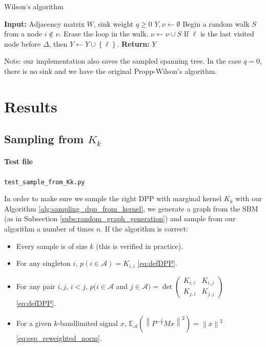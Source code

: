\documentclass{article}
\newcommand{\norm}[1]{\left\|#1\right\|}
\begin{document}
\begin{algorithm}[ht]
\caption{Wilson's algorithm}
\label{alg:wilson_algorithm}
\begin{algorithmic} %
    \STATE \textbf{Input:} Adjacency matrix $W$, sink weight $q \geq 0$
    \STATE $Y, \nu \leftarrow \emptyset$
			\STATE Begin a random walk $S$ from a node $i \notin \nu$.
				\STATE Erase the loop in the walk.
				\STATE $\nu \leftarrow \nu \cup S$
					\STATE If $\ell$ is the last visited node before $\Delta$, then $Y \leftarrow Y \cup \left\{\ell\right\}$.
				\ENDIF
			\ENDIF
		\ENDWHILE
		\STATE \textbf{Return:} $Y$
\end{algorithmic}
Note: our implementation also saves the sampled spanning tree. In the case $q = 0$, there is no sink and we have the original Propp-Wilson's algorithm.
\end{algorithm}


\section{Results}


\subsection[Sampling from Kk]{Sampling from $K_k$}


\paragraph{Test file} \verb#test_sample_from_Kk.py#


In order to make sure we sample the right DPP with marginal kernel $K_k$ with our Algorithm \ref{alg:sampling_dpp_from_kernel}, we generate a graph from the SBM (as in Subsection \ref{subs:random_graph_generation}) and sample from our algorithm a number of times $n$. If the algorithm is correct:
\begin{itemize}
\item Every sample is of size $k$ (this is verified in practice).
\item For any singleton $i$, $p(i \in \mathcal{A}) = K_{i, i}$ \eqref{eq:defDPP}.
\item For any pair $i, j$, $i < j$, $p(i \in \mathcal{A} $ and $ j \in \mathcal{A}) = \det \begin{pmatrix} K_{i, i} & K_{i, j} \\ K_{j, i} & K_{j, j} \end{pmatrix}$ \eqref{eq:defDPP}.
\item For a given $k$-bandlimited signal $x$, $\mathbb{E}_\mathcal{A} \left( \norm{P^{-\frac{1}{2}} M x}^2 \right) = \norm{x}^2$ \eqref{eq:esp_reweighted_norm}.
\end{itemize}
\end{document}
